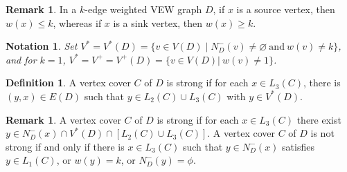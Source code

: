 \documentclass[11pt,reqno]{amsart}
\let\emptyset\varnothing
\newtheorem{notation}[theorem]{Notation}
\theoremstyle{definition}
\newtheorem{remark}[theorem]{Remark}
\newtheorem{definition}[theorem]{Definition}
\begin{document}
\begin{remark}\label{rem-sink-source}
In a $k$-edge weighted VEW graph $D$, if $x$ is a source vertex, then $w(x) \leq k$, whereas if $x$ is a sink vertex, then $w(x) \geq k$.
\end{remark}


\begin{notation}
	Set $V^{*} = V^{*}(D) = \{v \in V(D) \mid N_D^{-}(v) \neq \emptyset  ~\mbox{and}~ w(v) \neq k\}$, and for $k=1$,     $V^*=V^{+} = V^{+}(D) = \{v \in V(D)|~ w(v) \neq 1\}$.
\end{notation}


\begin{definition}
 	A vertex cover $ C $ of $ D $ is strong if for each $ x \in L_3(C)  $, there is $(y, x) \in E(D)$
 	such that $ y   \in L_2(C) \cup L_3(C)$ with $ y \in   V^{*}(D)$.
 \end{definition}   
 
 
 \begin{remark}\label{rem-3.9}
 	A vertex cover $ C $ of $ D $ is strong if for each $ x \in L_3(C)  $ there exist $ y \in N_D^-(x) \cap  V^{*}(D) \cap [L_2(C) \cup L_3(C)]$.       
 	A vertex cover $ C $ of $ D $ is not strong if and only if    there is $ x \in L_3(C)  $ such that $ y \in N_D^-(x) $ satisfies $ y   \in L_1(C) $, or   $ w(y) = k $, or $  N_D^-(y) = \phi $. 	
 \end{remark}
\end{document}
